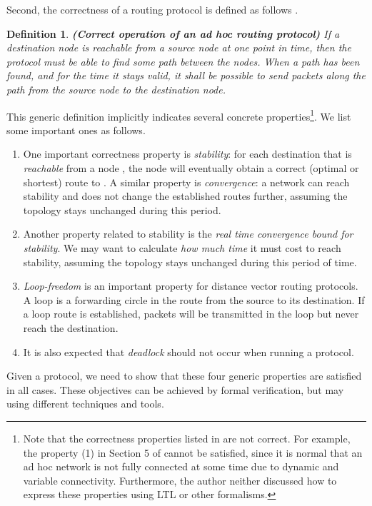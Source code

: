 \documentclass[a4paper,10pt,twocolumn]{article}
\newtheorem{definition}[theorem]{Definition}
\begin{document}
Second, the correctness of a routing protocol is defined as follows \cite{WPP04}.
\begin{definition}
\textbf{\emph{(Correct operation of an ad hoc routing protocol)}} If a destination node is reachable from a source node at one point in time, then the protocol must be able to find some path between the nodes. When a path has been found, and for the time it stays valid, it shall be possible to send packets along the path from the source node to the destination node.
\end{definition}
This generic definition implicitly indicates several concrete properties\footnote{Note that the correctness properties listed in \cite{Ole05} are not correct. For example, the property (1) in Section 5 of \cite{Ole05} cannot be satisfied, since it is normal that an ad hoc network is not fully connected at some time due to dynamic and variable connectivity. Furthermore, the author neither discussed how to express these properties using LTL or other formalisms.}. We list some important ones as follows.
\begin{enumerate}
  \item One important correctness property is \emph{stability}: for each destination  that is \emph{reachable} from a node , the node  will eventually obtain a correct (optimal or shortest) route to . A similar property is \emph{convergence}: a network can reach stability and does not change the established routes further, assuming the topology stays unchanged during this period.
  \item Another property related to stability is the \emph{real time convergence bound for stability}. We may want to calculate \emph{how much time} it must cost to reach stability, assuming the topology stays unchanged during this period of time.
  \item \emph{Loop-freedom} is an important property for distance vector routing protocols. A loop is a forwarding circle in the route from the source to its destination. If a loop route is established, packets will be transmitted in the loop but never reach the destination.
  \item It is also expected that \emph{deadlock} should not occur when running a protocol.
\end{enumerate}

Given a protocol, we need to show that these four generic properties are satisfied in all cases. These objectives can be achieved by formal verification, but may using different techniques and tools.
\end{document}
